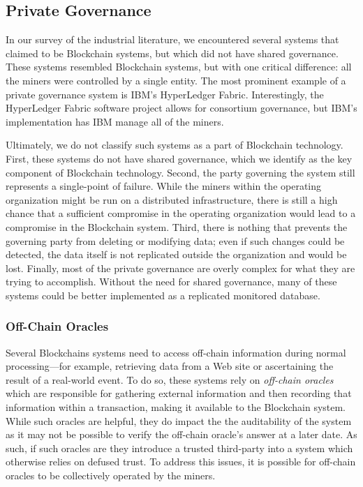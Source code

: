 {\subsection{Private Governance}
In our survey of the industrial literature, we encountered several systems that claimed to be Blockchain systems, but which did not have shared governance.
These systems resembled Blockchain systems, but with one critical difference: all the miners were controlled by a single entity.
The most prominent example of a private governance system is IBM's HyperLedger Fabric.
Interestingly, the HyperLedger Fabric software project allows for consortium governance, but IBM's implementation has IBM manage all of the miners.

Ultimately, we do not classify such systems as a part of Blockchain technology.
First, these systems do not have shared governance, which we identify as the key component of Blockchain technology.
Second, the party governing the system still represents a single-point of failure.
While the miners within the operating organization might be run on a distributed infrastructure, there is still a high chance that a sufficient compromise in the operating organization would lead to a compromise in the Blockchain system.
Third, there is nothing that prevents the governing party from deleting or modifying data; even if such changes could be detected, the data itself is not replicated outside the organization and would be lost.
Finally, most of the private governance are overly complex for what they are trying to accomplish.
Without the need for shared governance, many of these systems could be better implemented as a replicated monitored database.

\subsubsection{Off-Chain Oracles}
Several Blockchains systems need to access off-chain information during normal processing---for example, retrieving data from a Web site or ascertaining the result of a real-world event.
To do so, these systems rely on \emph{off-chain oracles} which are responsible for gathering external information and then recording that information within a transaction, making it available to the Blockchain system.
While such oracles are helpful, they do impact the the auditability of the system as it may not be possible to verify the off-chain oracle's answer at a later date.
As such, if such oracles are they introduce a trusted third-party into a system which otherwise relies on defused trust.
To address this issues, it is possible for off-chain oracles to be collectively operated by the miners.





}
